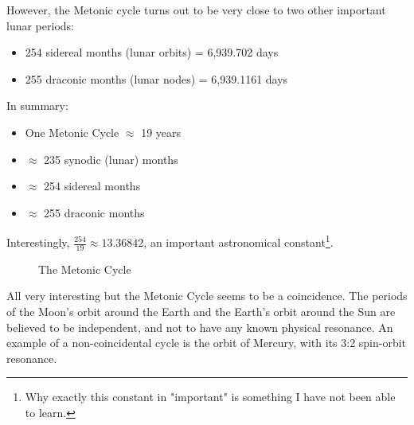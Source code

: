 \documentclass[11pt, oneside]{article}   	%
\theoremstyle{definition}
\begin{document}
\bigskip
\noindent
However, the Metonic cycle turns out to be very close to two other important lunar periods:

\begin{itemize}
\item 254 sidereal months (lunar orbits) = 6,939.702 days
\item 255 draconic months (lunar nodes) = 6,939.1161 days
\end{itemize}

\bigskip
\noindent
In summary: 

\begin{itemize}
\item One Metonic Cycle $\approx$ 19 years 
\item $\approx$ 235 synodic (lunar) months
\item $\approx$ 254 sidereal months
\item $\approx$ 255 draconic months
\end{itemize}

\bigskip
\noindent
Interestingly, $\frac{254}{19} \approx 13.36842$, an important astronomical constant\footnote{Why exactly this constant in "important" is something 
I have not been able to learn.}. 

\bigskip
\bigskip
\begin{figure}[H]
\caption{The Metonic Cycle \cite{youtube:freeth2021}}
\label{fig:metonic_cycle}
\end{figure}


\medskip
\bigskip
\noindent
All very interesting but the Metonic Cycle seems to be a coincidence. The periods of the Moon's orbit around the Earth and the Earth's 
orbit around the Sun are believed to be independent, and not to have any known physical resonance. An example of a non-coincidental 
cycle is the orbit of Mercury, with its 3:2 spin-orbit resonance.
\end{document}
